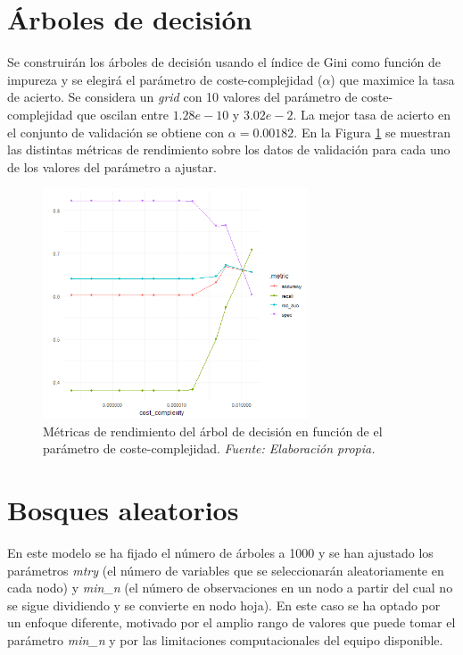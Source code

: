 \documentclass[12pt,a4paper,]{book}
\numberwithin{dummy}{section}
\theoremstyle{ocrenumbox}
\theoremstyle{blacknumex}
\theoremstyle{blacknumbox}
\theoremstyle{ocrenum}
\theoremstyle{ocrenum}
\begin{document}
\hypertarget{uxe1rboles-de-decisiuxf3n}{%
\section{Árboles de decisión}\label{uxe1rboles-de-decisiuxf3n}}

Se construirán los árboles de decisión usando el índice de Gini como
función de impureza y se elegirá el parámetro de coste-complejidad
(\(\alpha\)) que maximice la tasa de acierto. Se considera un
\emph{grid} con 10 valores del parámetro de coste-complejidad que
oscilan entre \(1.28e-10\) y \(3.02e- 2\). La mejor tasa de acierto en
el conjunto de validación se obtiene con \(\alpha = 0.00182\). En la
Figura \ref{fig:dt_tuningplot} se muestran las distintas métricas de
rendimiento sobre los datos de validación para cada uno de los valores
del parámetro a ajustar.

\begin{figure}[h!]
\centering
\includegraphics[width =0.7\textwidth]{graficos/dt_tuningplot.png}
\caption[Métricas de rendimiento del árbol de decisión en función de $\alpha$]{Métricas de rendimiento del árbol de decisión en función de el parámetro de coste-complejidad. \it Fuente: Elaboración propia.}
\label{fig:dt_tuningplot}
\end{figure}

\hypertarget{bosques-aleatorios}{%
\section{Bosques aleatorios}\label{bosques-aleatorios}}

En este modelo se ha fijado el número de árboles a 1000 y se han
ajustado los parámetros \emph{mtry} (el número de variables que se
seleccionarán aleatoriamente en cada nodo) y \emph{min\_n} (el número de
observaciones en un nodo a partir del cual no se sigue dividiendo y se
convierte en nodo hoja). En este caso se ha optado por un enfoque
diferente, motivado por el amplio rango de valores que puede tomar el
parámetro \emph{min\_n} y por las limitaciones computacionales del
equipo disponible.
\end{document}

